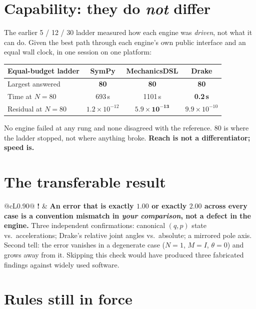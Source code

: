 \documentclass[10pt,a4paper]{article}
\begin{document}
\section{Capability: they do \emph{not} differ}

The earlier 5 / 12 / 30 ladder measured how each engine was \emph{driven}, not what
it can do. Given the best path through each engine's own public interface and
an equal wall clock, in one session on one platform:

\begin{tabular}{@{}lccc@{}}
\toprule
\textbf{Equal-budget ladder} & SymPy & MechanicsDSL & Drake \\
\midrule
Largest answered & \textbf{80} & \textbf{80} & \textbf{80} \\
Time at $N=80$ & 693\,s & 1101\,s & \textbf{0.2}\,\textbf{s} \\
Residual at $N=80$ & $1.2\times10^{-12}$ & $\mathbf{5.9\times10^{-13}}$ & $9.9\times10^{-10}$ \\
\bottomrule
\end{tabular}

\vspace{0.3em}
No engine failed at any rung and none disagreed with the reference. $80$ is
where the ladder stopped, not where anything broke. \textbf{Reach is not a
differentiator; speed is.}

\section{The transferable result}

\begin{tabular}{@{}cL{0.90\textwidth}@{}}
\textcolor{holdred}{\textbf{!}} & \textbf{An error that is exactly $1.00$ or exactly $2.00$ across every case is a convention mismatch in \emph{your comparison}, not a defect in the engine.} Three independent confirmations: canonical $(q,p)$ state vs.\ accelerations; Drake's relative joint angles vs.\ absolute; a mirrored pole axis. Second tell: the error vanishes in a degenerate case ($N{=}1$, $M{=}I$, $\theta{=}0$) and grows away from it. Skipping this check would have produced three fabricated findings against widely used software. \\
\end{tabular}

\section{Rules still in force}
\end{document}

